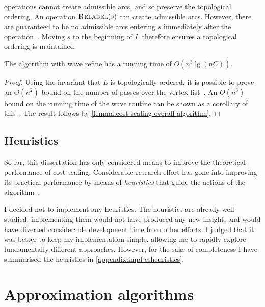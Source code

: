  operations cannot create admissible arcs, and so preserve the topological ordering. An operation $\textproc{Relabel}(s)$ can create admissible arcs. However, there are guaranteed to be no admissible arcs entering $s$ immediately after the operation~\cite[lemma~6.5]{Goldberg:1987}. Moving $s$ to the beginning of $L$ therefore ensures a topological ordering is maintained.\\

\begin{thm} \label{thm:cost-scaling-wave-complexity}
The algorithm with wave refine has a running time of $O(n^3 \lg (nC))$.
\end{thm}
\begin{proof}
Using the invariant that $L$ is topologically ordered, it is possible to prove an $O(n^2)$ bound on the number of passes over the vertex list~\cite[lemma~7.3]{Goldberg:1987}. An $O(n^3)$ bound on the running time of the wave  routine can be shown as a corollary of this~\cite[theorem~7.4]{Goldberg:1987}. The result follows by \cref{lemma:cost-scaling-overall-algorithm}.
\end{proof}

\subsection{Heuristics}

So far, this dissertation has only considered means to improve the theoretical performance of cost scaling. Considerable research effort has gone into improving its practical performance by means of \emph{heuristics} that guide the actions of the algorithm~\cite{Goldberg:1997}.

I decided not to implement any heuristics. The heuristics are already well-studied: implementing them would not have produced any new insight, and would have diverted considerable development time from other efforts. I judged that it was better to keep my implementation simple, allowing me to rapidly explore fundamentally different approaches. However, for the sake of completeness I have summarised the heuristics in \cref{appendix:impl-csheuristics}.


\section{Approximation algorithms} \label{sec:impl-approx}

